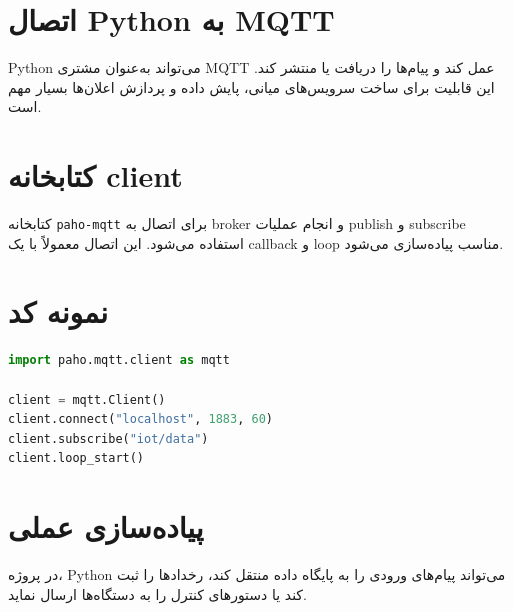 \section{اتصال Python به MQTT}

Python می‌تواند به‌عنوان مشتری MQTT عمل کند و پیام‌ها را دریافت یا منتشر کند. این قابلیت برای ساخت سرویس‌های میانی، پایش داده و پردازش اعلان‌ها بسیار مهم است.

\section{کتابخانه client}

کتابخانه \texttt{paho-mqtt} برای اتصال به broker و انجام عملیات publish و subscribe استفاده می‌شود. این اتصال معمولاً با یک callback و loop مناسب پیاده‌سازی می‌شود.

\section{نمونه کد}

\begin{lstlisting}[language=Python]
import paho.mqtt.client as mqtt

client = mqtt.Client()
client.connect("localhost", 1883, 60)
client.subscribe("iot/data")
client.loop_start()
\end{lstlisting}

\section{پیاده‌سازی عملی}

در پروژه، Python می‌تواند پیام‌های ورودی را به پایگاه داده منتقل کند، رخدادها را ثبت کند یا دستورهای کنترل را به دستگاه‌ها ارسال نماید.
